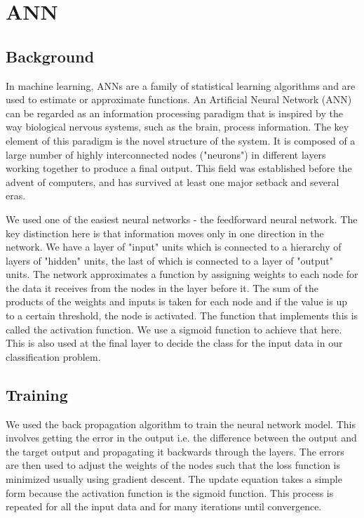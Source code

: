 \documentclass[11pt,letterpaper]{article}
\begin{document}
\section{ANN}

\subsection{Background}

In machine learning, ANNs are a family of statistical learning algorithms and are used to estimate or approximate functions. An Artificial Neural Network (ANN) can be regarded as an information processing paradigm that is inspired by the way biological nervous systems, such as the brain, process information.  The key element of this paradigm is the novel structure of the system. It is composed of a large number of highly interconnected nodes ("neurons") in different layers working together to produce a final output.  This field was established before the advent of computers, and has survived at least one major setback and several eras.

We used one of the easiest neural networks - the feedforward neural network. The key distinction here is that information moves only in one direction in the network. We have a layer of "input" units which is connected to a hierarchy of layers of "hidden" units, the last of which is connected to a layer of "output" units. The network approximates a function by assigning weights to each node for the data it receives from the nodes in the layer before it. The sum of the products of the weights and inputs is taken for each node and if the value is up to a certain threshold, the node is activated. The function that implements this is called the activation function. We use a sigmoid function to achieve that here. This is also used at the final layer to decide the class for the input data in our classification problem.

\subsection{Training}
We used the back propagation algorithm to train the neural network model. This involves getting the error in the output i.e. the difference between the output and the target output and propagating it backwards through the layers. The errors are then used to adjust the weights of the nodes such that the loss function is minimized usually using gradient descent. The update equation takes a simple form because the activation function is the sigmoid function. This process is repeated for all the input data and for many iterations until convergence.
\end{document}
